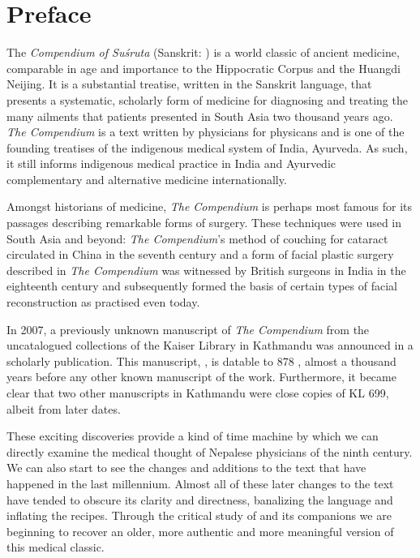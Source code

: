 \chapter*{Preface}

The \emph{Compendium of Suśruta} (Sanskrit: \SS) is a world classic of ancient
medicine, comparable in age and importance to the Hippocratic Corpus and the
Huangdi Neijing. It is a substantial treatise, written in the Sanskrit
language, that presents a systematic, scholarly form of medicine for
diagnosing and treating the many ailments that patients presented in South
Asia two thousand years ago. \emph{The Compendium} is a text written by
physicians for physicans and is one of the founding treatises of the
indigenous medical system of India, Ayurveda.  As such, it still informs
indigenous medical practice in India and Ayurvedic complementary and
alternative medicine internationally.

Amongst historians of medicine, \textit{The Compendium} is perhaps most famous
for its passages describing remarkable forms of surgery. These techniques were
used in South Asia and beyond: \emph{The Compendium}'s method of couching for
cataract circulated in China in the seventh century and a form of facial
plastic surgery described in \emph{The Compendium} was witnessed by British
surgeons in India in the eighteenth century and subsequently formed the basis
of certain types of facial reconstruction as practised even today.

In 2007, a previously unknown manuscript of \emph{The Compendium} from the
uncatalogued collections of the Kaiser Library in Kathmandu was announced in a
scholarly publication.  This manuscript, , is datable
to 878 \CE, almost a thousand years before any other known manuscript of the
work. Furthermore, it became clear that two other manuscripts in Kathmandu
were close copies of KL 699, albeit from later dates.

These exciting discoveries provide a kind of time machine by which we can directly
examine the medical thought of Nepalese physicians of the ninth century.  We
can also start to see the changes and additions to the text that have happened
in the last millennium.  Almost all of these later changes to the text have
tended to obscure its clarity and directness, banalizing the language and
inflating the recipes.  Through the critical study of   and its companions we are beginning to recover an older, more authentic
and more meaningful version of this medical classic.

